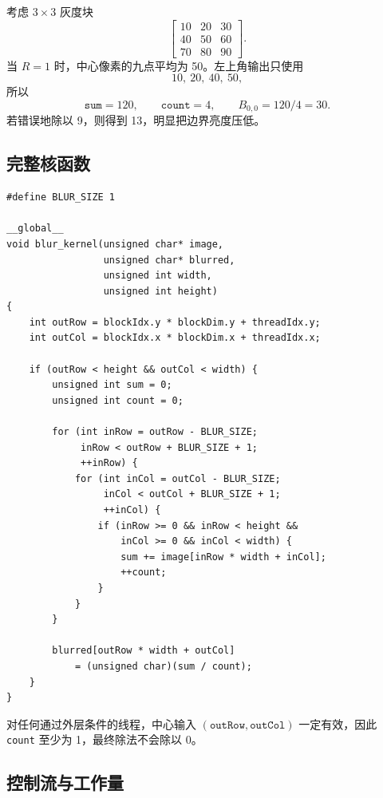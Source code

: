 \begin{examplebox}[title=角点像素的有效邻域]
考虑 $3\times3$ 灰度块
\[
\begin{bmatrix}
10&20&30\\
40&50&60\\
70&80&90
\end{bmatrix}.
\]
当 $R=1$ 时，中心像素的九点平均为 50。左上角输出只使用
\[
10,\ 20,\ 40,\ 50,
\]
所以
\[
\texttt{sum}=120,\qquad \texttt{count}=4,
\qquad B_{0,0}=120/4=30.
\]
若错误地除以 9，则得到 13，明显把边界亮度压低。
\end{examplebox}

\subsection{完整核函数}

\par\noindent\begin{minipage}{\linewidth}
\begin{lstlisting}[caption={对有效邻域求平均的完整灰度模糊核函数}]
#define BLUR_SIZE 1

__global__
void blur_kernel(unsigned char* image,
                 unsigned char* blurred,
                 unsigned int width,
                 unsigned int height)
{
    int outRow = blockIdx.y * blockDim.y + threadIdx.y;
    int outCol = blockIdx.x * blockDim.x + threadIdx.x;

    if (outRow < height && outCol < width) {
        unsigned int sum = 0;
        unsigned int count = 0;

        for (int inRow = outRow - BLUR_SIZE;
             inRow < outRow + BLUR_SIZE + 1;
             ++inRow) {
            for (int inCol = outCol - BLUR_SIZE;
                 inCol < outCol + BLUR_SIZE + 1;
                 ++inCol) {
                if (inRow >= 0 && inRow < height &&
                    inCol >= 0 && inCol < width) {
                    sum += image[inRow * width + inCol];
                    ++count;
                }
            }
        }

        blurred[outRow * width + outCol]
            = (unsigned char)(sum / count);
    }
}
\end{lstlisting}
\end{minipage}\par

对任何通过外层条件的线程，中心输入 $(\texttt{outRow},\texttt{outCol})$ 一定有效，因此 \texttt{count} 至少为 1，最终除法不会除以 0。

\subsection{控制流与工作量}

